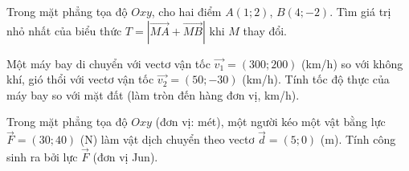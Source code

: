 \begin{bt}%
Trong mặt phẳng tọa độ $Oxy$, cho hai điểm $A(1;2)$, $B(4;-2)$. Tìm giá trị nhỏ nhất của biểu thức $T=|\overrightarrow{MA}+\overrightarrow{MB}|$ khi $M$ thay đổi.
\end{bt}

\begin{bt}%
Một máy bay di chuyển với vectơ vận tốc $\overrightarrow{v_1}=(300;200)$ (km/h) so với không khí, gió thổi với vectơ vận tốc $\overrightarrow{v_2}=(50;-30)$ (km/h). Tính tốc độ thực của máy bay so với mặt đất (làm tròn đến hàng đơn vị, km/h).
\end{bt}

\begin{bt}%
Trong mặt phẳng tọa độ $Oxy$ (đơn vị: mét), một người kéo một vật bằng lực $\overrightarrow{F}=(30;40)$ (N) làm vật dịch chuyển theo vectơ $\overrightarrow{d}=(5;0)$ (m). Tính công sinh ra bởi lực $\overrightarrow{F}$ (đơn vị Jun).
\end{bt}
